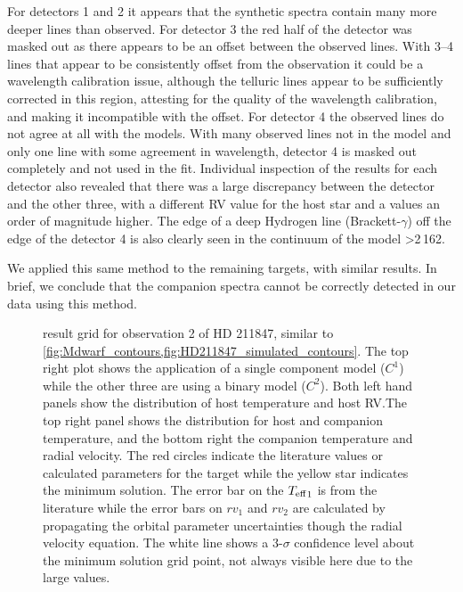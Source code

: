 For detectors 1 and 2 it appears that the synthetic spectra contain many more deeper lines than observed.
For detector 3 the red half of the detector was masked out as there appears to be an offset between the observed lines.
With 3--4 lines that appear to be consistently offset from the observation it could be a wavelength calibration issue, although the telluric lines appear to be sufficiently corrected in this region, attesting for the quality of the wavelength calibration, and making it incompatible with the offset.
For detector 4 the observed lines do not agree at all with the models.
With many observed lines not in the model and only one line with some agreement in wavelength, detector 4 is masked out completely and not used in the \textchisquared{} fit.
Individual inspection of the \textchisquared{} results for each detector also revealed that there was a large discrepancy between the  detector and the other three, with a different {RV} value for the host star and a \textchisquared{} values an order of magnitude higher.
The edge of a deep Hydrogen line (Brackett-\(\gamma\)) off the edge of the detector 4 is also clearly seen in the continuum of the model >2\,162\nm{}.

We applied this same method to the remaining targets, with similar results.
In brief, we conclude that the companion spectra cannot be correctly detected in our data using this method.
\begin{figure*}
    \centering
    \caption{\textchisquared{} result grid for observation 2 of {HD 211847}, similar to \cref{fig:Mdwarf_contours,fig:HD211847_simulated_contours}.
The top right plot shows the application of a single component model (\(C^1\)) while the other three are using a binary model (\(C^2\)).
Both left hand panels show the distribution of host temperature and host {RV}.\@ The top right panel shows the distribution for host and companion temperature, and the bottom right the companion temperature and radial velocity.
The red circles indicate the literature values or calculated parameters for the target while the yellow star indicates the minimum \textchisquared{} solution.
The error bar on the \({T_{\mathrm{eff}}}_{1}\) is from the literature while the error bars on \({rv}_1\) and \({rv}_2\) are calculated by propagating the orbital parameter uncertainties though the radial velocity equation.
The white line shows a 3-\(\sigma\) confidence level about the minimum \textchisquared{} solution grid point, not always visible here due to the large \textchisquared{} values.}
    \label{fig:HD211847_result_contours}
\end{figure*}


